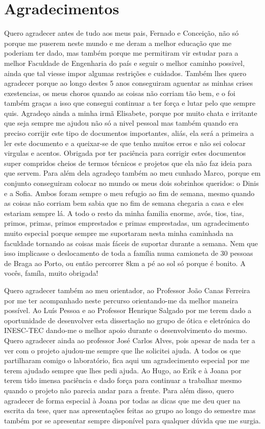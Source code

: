 \chapter*{Agradecimentos}
Quero agradecer antes de tudo aos meus pais, Fernado e Conceição, não só porque me puserem neste mundo e me deram a melhor educação que me poderiam ter dado, mas também porque me permitiram vir estudar para a melhor Faculdade de Engenharia do país e seguir o melhor caminho possivel, ainda que tal viesse impor algumas restrições e cuidados. Também lhes quero agradecer porque ao longo destes 5 anos conseguiram aguentar as minhas crises exestencias, os meus choros quando as coisas não corriam tão bem, e o foi também graças a isso que consegui continuar a ter força e lutar pelo que sempre quis. Agradeço ainda a minha irmã Elisabete, porque por muito chata e irritante que seja sempre me ajudou não só a nivel pessoal mas também quando era preciso corrijir este tipo de documentos importantes, aliás, ela será a primeira a ler este documento e a queixar-se de que tenho muitos erros e não sei colocar virgulas e acentos. Obrigada por ter paciência para corrigir estes documentos super compridos cheios de termos técnicos e projetos que ela não faz ideia para que servem. Para além dela agradeço também ao meu cunhado Marco, porque em conjunto conseguiram colocar no mundo os meus dois sobrinhos queridos: o Dinis e a Sofia. Ambos foram sempre o meu refugio ao fim de semana, mesmo quando as coisas não corriam bem sabia que no fim de semana chegaria a casa e eles estariam sempre lá. A todo o resto da minha familia enorme, avós, tios, tias, primos, primas, primos emprestados e primas emprestadas, um agradecimento muito especial porque sempre me suportaram nesta minha caminhada na faculdade tornando as coisas mais fáceis de suportar durante a semana. Nem que isso implicasse o deslocamento de toda a família numa camioneta de 30 pessoas de Braga ao Porto, ou então percorrer 8km a pé ao sol só porque é bonito. A vocês, famíla, muito obrigada!

Quero agradecer também ao meu orientador, ao Professor João Canas Ferreira por me ter acompanhado neste percurso orientando-me da melhor maneira possível. Ao Luís Pessoa e ao Professor Henrique Salgado por me terem dado a oportunidade de desenvolver esta dissertação no grupo de ótica e eletrónica do INESC-TEC dando-me o melhor apoio durante o desenvolvimento do mesmo. Quero agradecer ainda ao professor José Carlos Alves, pois apesar de nada ter a ver com o projeto ajudou-me sempre que lhe solicitei ajuda.  A todos os que partilharam comigo o laboratório, fica aqui um agradecimento especial por me terem ajudado sempre que lhes pedi ajuda. Ao Hugo, ao Erik e à Joana por terem tido imensa paciência e dado força para continuar a trabalhar mesmo quando o projeto não parecia andar para a frente. Para além disso, quero agradecer de forma especial à Joana por todas as dicas que me deu quer na escrita da tese, quer nas apresentações feitas ao grupo ao longo do semestre mas também por se apresentar sempre disponível para qualquer dúvida que me surgia. 

